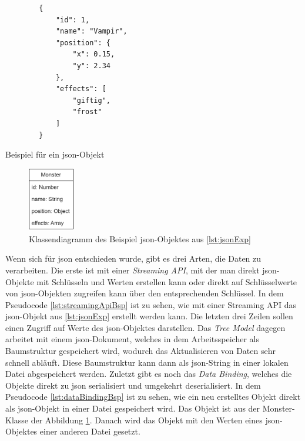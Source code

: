 \begin{listing}[htp]
    \begin{verbatim}
        {
            "id": 1,
            "name": "Vampir",
            "position": {
                "x": 0.15,
                "y": 2.34
            },
            "effects": [
                "giftig", 
                "frost"
            ]
        }
    \end{verbatim}
    \caption{Beispiel für ein \ac{json}-Objekt}
    \label{lst:jsonExp}
\end{listing}

\begin{figure}[htp]
    \centering
    \includegraphics[width=0.18\textwidth]{images/MonsterBspKlasse.png}
    \caption{Klassendiagramm des Beispiel \ac{json}-Objektes aus \ref{lst:jsonExp}}
    \label{fig:monsterBspKlasse}
\end{figure}

Wenn sich für \ac{json} entschieden wurde, gibt es drei Arten, die Daten zu verarbeiten. Die erste ist mit einer \textit{Streaming API}, mit der man direkt \ac{json}-Objekte mit Schlüsseln und Werten erstellen kann oder direkt auf Schlüsselwerte von \ac{json}-Objekten zugreifen kann über den  entsprechenden Schlüssel. In dem Pseudocode \ref{lst:streamingApiBsp} ist zu sehen, wie mit einer Streaming API das \ac{json}-Objekt aus \ref{lst:jsonExp} erstellt werden kann. Die letzten drei Zeilen sollen einen Zugriff auf Werte des \ac{json}-Objektes darstellen.\cite{tutorialspointJacksonStreaming} Das \textit{Tree Model} dagegen arbeitet mit einem \ac{json}-Dokument, welches in dem Arbeitsspeicher als Baumstruktur gespeichert wird, wodurch das Aktualisieren von Daten sehr schnell abläuft. Diese Baumstruktur kann dann als \ac{json}-String in einer lokalen Datei abgespeichert werden. Zuletzt gibt es noch das \textit{Data Binding}, welches die Objekte direkt zu \ac{json} serialisiert und umgekehrt deserialisiert. In dem Pseudocode \ref{lst:dataBindingBsp} ist zu sehen, wie ein neu erstelltes Objekt direkt als \ac{json}-Objekt in einer Datei gespeichert wird. Das Objekt ist aus der Monster-Klasse der Abbildung \ref{fig:monsterBspKlasse}. Danach wird das Objekt mit den Werten eines \ac{json}-Objektes einer anderen Datei gesetzt.\cite{tutorialspointJacksonData}\cite{tutorialspointJacksonOverview}

